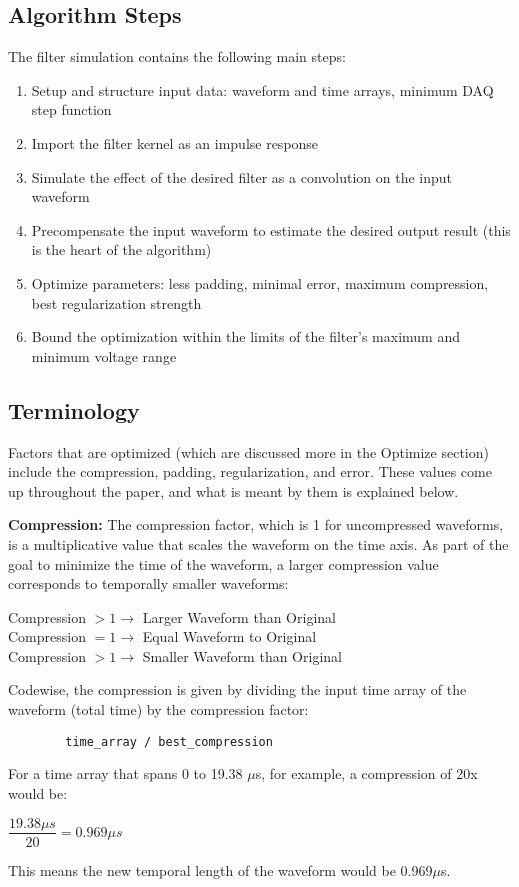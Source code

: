 \subsection{Algorithm Steps}
The filter simulation contains the following main steps:

\begin{enumerate}
    \item Setup and structure input data: waveform and time arrays, minimum DAQ step function
    \item Import the filter kernel as an impulse response
    \item Simulate the effect of the desired filter as a convolution on the input waveform
    \item Precompensate the input waveform to estimate the desired output result (this is the heart of the algorithm)
    \item Optimize parameters: less padding, minimal error, maximum compression, best regularization strength
    \item Bound the optimization within the limits of the filter's maximum and minimum voltage range
\end{enumerate}

\subsection{Terminology}
Factors that are optimized (which are discussed more in the Optimize section) include the compression, padding, regularization, and error. These values come up throughout the paper, and what is meant by them is explained below.
\begin{definition}
     \textbf{Compression:} The compression factor, which is 1 for uncompressed waveforms, is a multiplicative value that scales the waveform on the time axis. As part of the goal to minimize the time of the waveform, a larger compression value corresponds to temporally smaller waveforms:
    \begin{center}
        Compression $> 1 \rightarrow$ Larger Waveform than Original \\
        Compression $= 1 \rightarrow$ Equal Waveform to Original \\
        Compression $> 1 \rightarrow$ Smaller Waveform than Original
    \end{center}
    Codewise, the compression is given by dividing the input time array of the waveform (total time) by the compression factor:
    \begin{verbatim}
        time_array / best_compression
    \end{verbatim}
    For a time array that spans 0 to 19.38 $\mu$s, for example, a compression of 20x would be:
    \begin{center}
        $\dfrac{19.38 \mu s}{20} = 0.969 \mu s$
    \end{center}
    This means the new temporal length of the waveform would be 0.969$\mu$s.
\end{definition}

